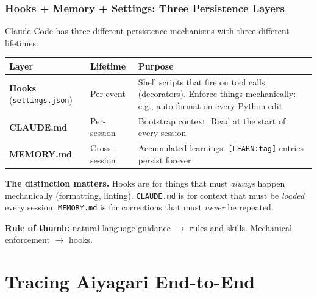 \documentclass[10pt,english,aspectratio=169]{beamer}
\begin{document}
\begin{frame}
\frametitle{Hooks + Memory + Settings: Three Persistence Layers}

Claude Code has three different persistence mechanisms with three different lifetimes:

\vspace{0.3cm}

\begin{center}
\small
\begin{tabular}{|l|l|p{6.8cm}|}
\hline
\textbf{Layer} & \textbf{Lifetime} & \textbf{Purpose} \\ \hline
\textbf{Hooks} (\texttt{settings.json}) & Per-event & Shell scripts that fire on tool calls (decorators). Enforce things mechanically: e.g., auto-format on every Python edit \\ \hline
\textbf{CLAUDE.md} & Per-session & Bootstrap context. Read at the start of every session \\ \hline
\textbf{MEMORY.md} & Cross-session & Accumulated learnings. \texttt{[LEARN:tag]} entries persist forever \\ \hline
\end{tabular}
\end{center}

\vspace{0.3cm}

\textbf{The distinction matters.} Hooks are for things that must \textit{always} happen mechanically (formatting, linting). \texttt{CLAUDE.md} is for context that must be \textit{loaded} every session. \texttt{MEMORY.md} is for corrections that must \textit{never} be repeated.

\vspace{0.1cm}

\textbf{Rule of thumb:} natural-language guidance $\to$ rules and skills. Mechanical enforcement $\to$ hooks.
\end{frame}

\section{Tracing Aiyagari End-to-End}
\end{document}
